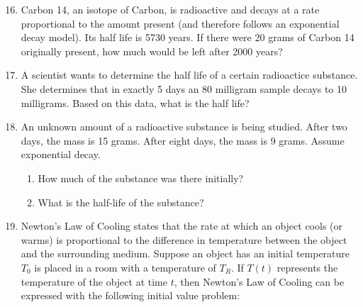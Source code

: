 \documentclass[12pt]{article}
\newif\ifans
\begin{document}
\begin{enumerate}
\setcounter{enumi}{15}

\item Carbon 14, an isotope of Carbon, is radioactive and decays at a rate proportional to the amount present (and therefore follows an exponential decay model).  Its half life is 5730 years.  If there were 20 grams of Carbon 14 originally present, how much would be left after 2000 years?

\ifans{\fbox{$y(t)=20(2)^{-t/5730}$.  Thus, $y(2000)=20(2)^{-2000/5730}\approx 15.702$ grams.}} \fi

\item A scientist wants to determine the half life of a certain radioactice substance.  She determines that in exactly 5 days an 80 milligram sample decays to 10 milligrams.  Based on this data, what is the half life?

\ifans{\fbox{$\frac{5}{3}$; Detailed Solution: \textcolor{blue}{\href{http://www.math.drexel.edu/classes/Calculus/resources/Math122HW/Solutions/122_14_ODE_17.pdf}{Here}}}} \fi

\item An unknown amount of a radioactive substance is being studied.  After two days, the mass is 15 grams.  After eight days, the mass is 9 grams.  Assume exponential decay.

\begin{enumerate}

\item How much of the substance was there initially?

\ifans{\fbox{$y_0\approx 17.78$ grams}} \fi

\item What is the half-life of the substance?

\ifans{\fbox{$t_{1/2}=-\frac{6\ln{2}}{\ln{\left(\frac{9}{15}\right)}}\approx 8.14$ days}} \fi

\end{enumerate}

\item Newton's Law of Cooling states that the rate at which an object cools (or warms) is proportional to the difference in temperature between the object and the surrounding medium.  Suppose an object has an initial temperature $T_0$ is placed in a room with a temperature of $T_R$.  If $T(t)$ represents the temperature of the object at time $t$, then Newton's Law of Cooling can be expressed with the following initial value problem:


\end{enumerate}
\end{document}
